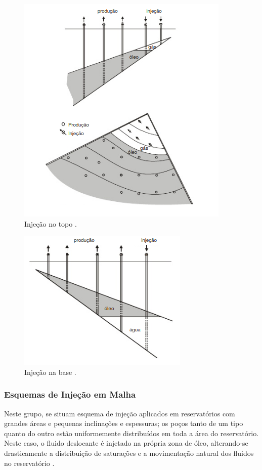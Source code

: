 \begin{figure}[!ht]
\centering
\includegraphics[width=.6\textwidth]{figs/revisao/revisao_injtop.png}
\caption{Inje\c{c}\~{a}o no topo \cite[p. 566]{engres}.}
\label{fig:rev_injtop}
\end{figure}

\begin{figure}[!ht]
\centering
\includegraphics[width=.6\textwidth]{figs/revisao/revisao_injbas.png}
\caption{Inje\c{c}\~{a}o na base \cite[p. 566]{engres}.}
\label{fig:rev_injbas}
\end{figure}





\subsubsection{Esquemas de Inje\c{c}\~{a}o em Malha}
Neste grupo, se situam esquema de inje\c{c}\~{a}o aplicados em reservat\'{o}rios com grandes \'{a}reas e pequenas inclina\c{c}\~{o}es e espessuras; os po\c{c}os tanto de um tipo quanto do outro est\~{a}o uniformemente distribu\'{i}dos em toda a \'{a}rea do reservat\'{o}rio. Neste caso, o fluido deslocante \'{e} injetado na pr\'{o}pria zona de \'{o}leo, alterando-se drasticamente a distribui\c{c}\~{a}o de satura\c{c}\~{o}es e a movimenta\c{c}\~{a}o natural dos fluidos no reservat\'{o}rio \cite[p. 567]{engres}.

